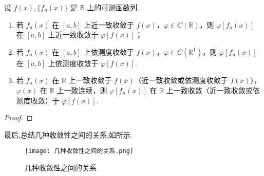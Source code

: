 \documentclass[../../main.tex]{subfiles}
\begin{document}
\begin{theorem}
设 $f(x),\{f_n(x)\}$ 是 $\mathbb{R}$ 上的可测函数列.
\begin{enumerate}[(1)]
\item 若 $f_n(x)$ 在 $[a,b]$ 上近一致收敛于 $f(x)$，$\varphi\in C(\mathbb{R})$，则 $\varphi[f_n(x)]$ 在 $[a,b]$ 上近一致收敛于 $\varphi[f(x)]$；

\item 若 $f_n(x)$ 在 $[a,b]$ 上依测度收敛于 $f(x)$，$\varphi\in C(\mathbb{R}^1)$，则 $\varphi[f_n(x)]$ 在 $[a,b]$ 上依测度收敛于 $\varphi[f(x)]$.

\item 若 $f_n(x)$ 在 $\mathbb{R}$ 上一致收敛于 $f(x)$（近一致收敛或依测度收敛于 $f(x)$），$\varphi(x)$ 在 $\mathbb{R}$ 上一致连续，则 $\varphi[f_n(x)]$ 在 $\mathbb{R}$ 上一致收敛（近一致收敛或依测度收敛）于 $\varphi[f(x)]$. 
\end{enumerate}
\end{theorem}
\begin{proof}


\end{proof}


最后,总结几种收敛性之间的关系,如所示.
\begin{figure}[H]
\centering
\texttt{[image: 几种收敛性之间的关系.png]}
\caption{几种收敛性之间的关系}
\label{image:几种收敛性之间的关系}
\end{figure}
\end{document}
